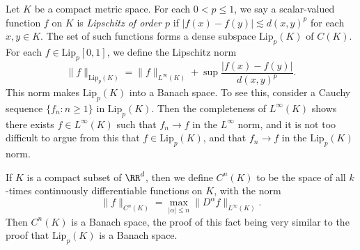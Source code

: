 \begin{example}
    Let $K$ be a compact metric space. For each $0 < p \leq 1$, we say a scalar-valued function $f$ on $K$ is {\it Lipschitz of order $p$} if $|f(x) - f(y)| \lesssim d(x,y)^p$ for each $x,y \in K$. The set of such functions forms a dense subspace $\text{Lip}_p(K)$ of $C(K)$. For each $f \in \text{Lip}_p [0,1]$, we define the Lipschitz norm
    \[ \| f \|_{\text{Lip}_p(K)} = \| f \|_{L^\infty(K)} + \sup \frac{|f(x) - f(y)|}{d(x,y)^p}. \]
    This norm makes $\text{Lip}_p(K)$ into a Banach space. To see this, consider a Cauchy sequence $\{ f_n : n \geq 1 \}$ in $\text{Lip}_p(K)$. Then the completeness of $L^\infty(K)$ shows there exists $f \in L^\infty(K)$ such that $f_n \to f$ in the $L^\infty$ norm, and it is not too difficult to argue from this that $f \in \text{Lip}_p(K)$, and that $f_n \to f$ in the $\text{Lip}_p(K)$ norm.
\end{example}

\begin{example}
    If $K$ is a compact subset of $\RR^d$, then we define $C^n(K)$ to be the space of all $k$-times continuously differentiable functions on $K$, with the norm
    \[ \| f \|_{C^n(K)} = \max_{|\alpha| \leq n} \| D^\alpha f \|_{L^\infty(K)}. \]
    Then $C^n(K)$ is a Banach space, the proof of this fact being very similar to the proof that $\text{Lip}_p(K)$ is a Banach space.
\end{example}

